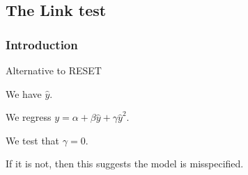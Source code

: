 
\subsection{The Link test}

\subsubsection{Introduction}

Alternative to RESET

We have \(\hat y\).

We regress \(y=\alpha + \beta \hat y + \gamma \hat y^2\).

We test that \(\gamma =0\).

If it is not, then this suggests the model is misspecified.

